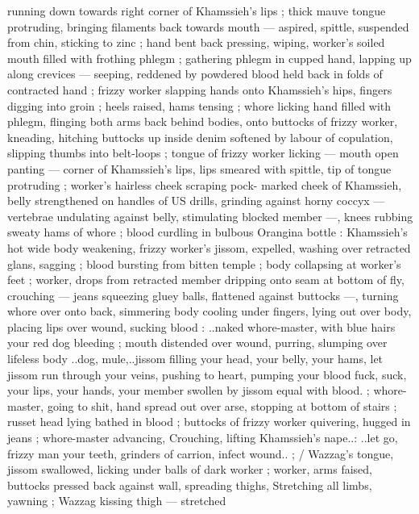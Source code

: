 running down towards right corner of Khamssieh's lips ; thick mauve 
tongue protruding, bringing filaments back towards mouth --- 
aspired, spittle, suspended from chin, sticking to zinc ; hand bent 
back pressing, wiping, worker's soiled mouth filled with frothing 
phlegm ; gathering phlegm in cupped hand, lapping up along 
crevices --- seeping, reddened by powdered blood held back in folds 
of contracted hand ; frizzy worker slapping hands onto Khamssieh's 
hips, fingers digging into groin ; heels raised, hams tensing ; whore 
licking hand filled with phlegm, flinging both arms back behind 
bodies, onto buttocks of frizzy worker, kneading, hitching buttocks 
up inside denim softened by labour of copulation, slipping thumbs 
into belt-loops ; tongue of frizzy worker licking --- mouth open 
panting --- corner of Khamssieh's lips, lips smeared with spittle, tip 
of tongue protruding ; worker's hairless cheek scraping pock- 
marked cheek of Khamssieh, belly strengthened on handles of US 
drills, grinding against horny coccyx --- vertebrae undulating against 
belly, stimulating blocked member ---, knees rubbing sweaty hams of 
whore ; blood curdling in bulbous Orangina bottle : Khamssieh's hot 
wide body weakening, frizzy worker's jissom, expelled, washing over 
retracted glans, sagging ; blood bursting from bitten temple ; body 
collapsing at worker's feet ; worker, drops from retracted member 
dripping onto seam at bottom of fly, crouching --- jeans squeezing 
gluey balls, flattened against buttocks ---, turning whore over onto 
back, simmering body cooling under fingers, lying out over body, 
placing lips over wound, sucking blood : {\gl}..naked whore-master, with 
blue hairs{\thd} your red dog bleeding{\thd}{\gr} ; mouth distended over wound, 
purring, slumping over lifeless body{\td} {\gl}..dog, mule,..jissom filling 
your head, your belly, your hams, let jissom run through your veins, 
pushing to heart, pumping your blood{\td} fuck, suck, your lips, your 
hands, your member swollen by jissom equal with blood.{\gr} ; whore- 
master, going to shit, hand spread out over arse, stopping at bottom 
of stairs ; russet head lying bathed in blood ; buttocks of frizzy 
worker quivering, hugged in jeans ; whore-master advancing, 
Crouching, lifting Khamssieh's nape..: {\gl}..let go, frizzy man{\thd} your 
teeth, grinders of carrion, infect wound..{\gr} ; {\slash} Wazzag's tongue, 
jissom swallowed, licking under balls of dark worker ; worker, arms 
faised, buttocks pressed back against wall, spreading thighs, 
Stretching all limbs, yawning ; Wazzag kissing thigh --- stretched 
